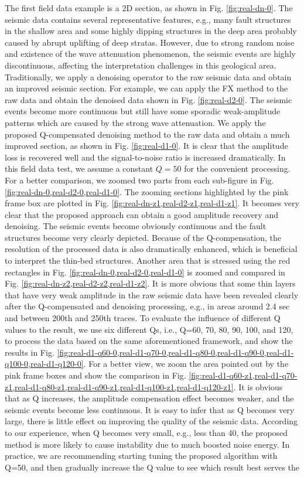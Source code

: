 The first field data example is a 2D section, as shown in Fig. \ref{fig:real-dn-0}. The seismic data contains several representative features, e.g., many fault structures in the shallow area and some highly dipping structures in the deep area probably caused by abrupt uplifting of deep stratas. However, due to  strong random noise and existence of the wave attenuation phenomenon, the seismic events are highly discontinuous, affecting the interpretation challenges in this geological area.  Traditionally, we apply a denoising operator to the raw seismic data and obtain an improved seismic section. For example, we can apply the FX method to the raw data and obtain the denoised data shown in Fig. \ref{fig:real-d2-0}. The seismic events become more continuous but still have some sporadic weak-amplitude patterns which are caused by the strong wave attenuation. We apply the proposed Q-compensated denoising method to the raw data and obtain a much improved section, as shown in Fig. \ref{fig:real-d1-0}. It is clear that the amplitude loss is recovered well and the signal-to-noise ratio is increased dramatically. In this field data test, we assume a constant $Q=50$ for the convenient processing. For a better comparison, we zoomed two parts from each sub-figure in Fig. \ref{fig:real-dn-0,real-d2-0,real-d1-0}.  The zooming sections highlighted by the pink frame box are plotted in Fig. \ref{fig:real-dn-z1,real-d2-z1,real-d1-z1}. It becomes very clear that the proposed approach can obtain a good amplitude recovery and denoising. The seismic events become obviously continuous and the fault structures become very clearly depicted. Because of the Q-compensation, the resolution of the processed data is also dramatically enhanced, which is beneficial to interpret the thin-bed structures. Another area that is stressed using the red rectangles in Fig. \ref{fig:real-dn-0,real-d2-0,real-d1-0} is zoomed and compared in Fig. \ref{fig:real-dn-z2,real-d2-z2,real-d1-z2}. It is more obvious that some thin layers that have  very weak amplitude in the raw seismic data have been revealed clearly after the Q-compensated and denoising processing, e.g., in areas around 2.4 sec and between 200th and 250th traces. To evaluate the influence of different Q values to the result, we use six different Qs, i.e., Q=60, 70, 80, 90, 100, and 120, to process the data based on the same aforementioned framework, and show the results in Fig. \ref{fig:real-d1-q60-0,real-d1-q70-0,real-d1-q80-0,real-d1-q90-0,real-d1-q100-0,real-d1-q120-0}. For a better view, we zoom the area pointed out by the pink frame boxes and show the comparison in Fig. \ref{fig:real-d1-q60-z1,real-d1-q70-z1,real-d1-q80-z1,real-d1-q90-z1,real-d1-q100-z1,real-d1-q120-z1}. It is obvious that as Q increases, the amplitude compensation effect becomes weaker, and the seismic events become less continuous. It is easy to infer that as Q becomes very large, there is little effect on improving the quality of the seismic data. According to our experience, when Q becomes very small, e.g., less than 40, the proposed method is more likely to cause instability due to much boosted noise energy.  In practice, we are recommending starting tuning the proposed algorithm with Q=50, and then gradually increase the Q value to see which result best serves the 